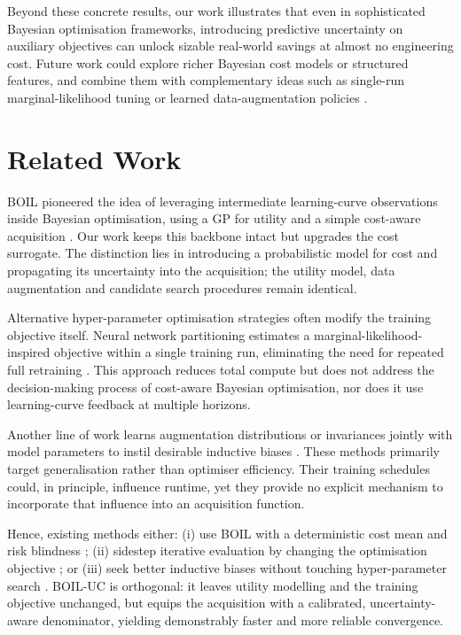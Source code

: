 \documentclass{article} %
\begin{document}
Beyond these concrete results, our work illustrates that even in sophisticated Bayesian optimisation frameworks, introducing predictive uncertainty on auxiliary objectives can unlock sizable real-world savings at almost no engineering cost. Future work could explore richer Bayesian cost models or structured features, and combine them with complementary ideas such as single-run marginal-likelihood tuning \cite{mlodozeniec-2023-hyperparameter} or learned data-augmentation policies \cite{benton-2020-augerino}.

\section{Related Work}
\label{sec:related}
BOIL pioneered the idea of leveraging intermediate learning-curve observations inside Bayesian optimisation, using a GP for utility and a simple cost-aware acquisition \cite{nguyen-2019-bayesian}. Our work keeps this backbone intact but upgrades the cost surrogate. The distinction lies in introducing a probabilistic model for cost and propagating its uncertainty into the acquisition; the utility model, data augmentation and candidate search procedures remain identical.

Alternative hyper-parameter optimisation strategies often modify the training objective itself. Neural network partitioning estimates a marginal-likelihood-inspired objective within a single training run, eliminating the need for repeated full retraining \cite{mlodozeniec-2023-hyperparameter}. This approach reduces total compute but does not address the decision-making process of cost-aware Bayesian optimisation, nor does it use learning-curve feedback at multiple horizons.

Another line of work learns augmentation distributions or invariances jointly with model parameters to instil desirable inductive biases \cite{benton-2020-augerino}. These methods primarily target generalisation rather than optimiser efficiency. Their training schedules could, in principle, influence runtime, yet they provide no explicit mechanism to incorporate that influence into an acquisition function.

Hence, existing methods either: (i) use BOIL with a deterministic cost mean and risk blindness \cite{nguyen-2019-bayesian}; (ii) sidestep iterative evaluation by changing the optimisation objective \cite{mlodozeniec-2023-hyperparameter}; or (iii) seek better inductive biases without touching hyper-parameter search \cite{benton-2020-augerino}. BOIL-UC is orthogonal: it leaves utility modelling and the training objective unchanged, but equips the acquisition with a calibrated, uncertainty-aware denominator, yielding demonstrably faster and more reliable convergence.
\end{document}

